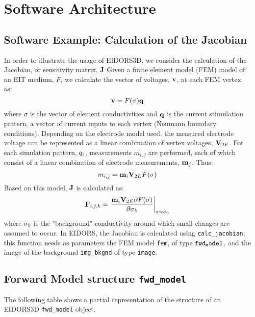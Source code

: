 \documentclass[12pt]{iopart}
\begin{document}
\section{Software Architecture}

\subsection{Software Example: Calculation of the Jacobian}
In order to illustrate the usage of EIDORS3D, we consider
the calculation of the Jacobian, or sensitivity matrix,
$\bf J$
Given a finite element model (FEM) model of an EIT medium,
$F$, we calculate the vector of voltages, $\bf v$, 
at each FEM vertex as:
\begin{equation}
{\bf v} = F( \sigma ){\bf q} 
\end{equation}
where $\sigma$ is the vector of element conductivities
and $\bf q$ is the current stimulation pattern, a vector
of current inputs to each vertex (Neumann boundary conditions).
Depending on the electrode model used, the measured electrode
voltage can be represented as a linear combination of vertex
voltages, ${\bf V}_{2E}$.
For each simulation pattern, ${\bf }q_{i}$,
measurements $m_{i,j}$
are performed, each of which consist of a linear combination of
electrode measurements, ${\bf m}_j$.
Thus:
\begin{equation}
m_{i,j} = {\bf m}_{i} {\bf V}_{2E} F( \sigma )
\end{equation}
Based on this model, $\bf J$ is calculated as:
\begin{equation}
{\bf F}_{i,j,k} = \left.\frac{
 {\bf m}_{i} {\bf V}_{2E}{\partial}F( \sigma )
}{
{\partial}{\bf \sigma}_k
}
\right|_{
   {\bf \sigma} = {\bf \sigma}_0 
}
\end{equation}
where ${\bf \sigma}_0$ is the "background"
conductivity around which small changes are assumed to occur.
In EIDORS, the Jacobian is calculated using {\tt calc\_jacobian};
this function needs as parameters the FEM model {\tt fem},
of type $\tt fwd_model$,
and the image of the background {\tt img\_bkgnd}
of type {\tt image}.

\subsection{Forward Model structure {\tt fwd\_model} }

The following table shows a partial representation of 
the structure of an EIDORS3D {\tt fwd\_model} object.
\end{document}

